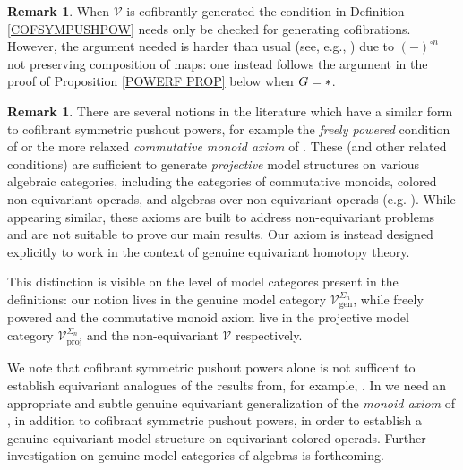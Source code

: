 \documentclass[a4paper,10pt
,draft
]{article}%
\numberwithin{equation}{section}
\numberwithin{figure}{section}
\theoremstyle{definition} %
\newtheorem{remark}[equation]{Remark}%
\newcommand{\V}{\ensuremath{\mathcal V}}
\newcommand{\1}{\ensuremath{\mathbbm 1}}%
\begin{document}
\begin{remark}
When $\mathcal{V}$ is cofibrantly generated
the condition in Definition \ref{COFSYMPUSHPOW} needs only be checked for generating cofibrations. 
However, the argument needed is harder than usual
(see, e.g., \cite[Lemma 2.1.20]{Ho98}) due to $(-)^{\square n}$ not preserving composition of maps:
one instead follows the argument in the proof of 
Proposition \ref{POWERF PROP} below when $G=\**$.
\end{remark}

\begin{remark}
      \label{CSPP_REM}
      There are several notions in the literature which have a similar form to cofibrant symmetric pushout powers,
      for example
      the \textit{freely powered} condition of \cite[Def. 4.5.4.2]{Lur17}
      or the more relaxed \textit{commutative monoid axiom} of \cite[Def. 3.1]{Wh16}.
      These (and other related conditions) are sufficient to generate \textit{projective} model structures on various algebraic categories,
      including the categories of commutative monoids, colored non-equivariant operads, and algebras over non-equivariant operads (e.g. \cite{Wh16,WY18}).
      While appearing similar,
      these axioms are built to address non-equivariant problems and are not suitable to prove our main results.
      Our axiom is instead designed explicitly to work in the context of genuine equivariant homotopy theory.

      This distinction is visible on the level of model categores present in the definitions:
      our notion lives in the genuine model category $\V^{\Sigma_n}_{\text{gen}}$,
      while freely powered and the commutative monoid axiom live in
      the projective model category $\V^{\Sigma_n}_{\text{proj}}$
      and the non-equivariant $\V$ respectively.

      We note that cofibrant symmetric pushout powers alone is not sufficent
      to establish equivariant analogues of the results from, for example, \cite{Wh16,WY18}.
      In \cite{BP_HGOP} we need an appropriate and subtle genuine equivariant generalization of the
      \textit{monoid axiom} of \cite{SS00},
      in addition to cofibrant symmetric pushout powers,
      in order to establish a genuine equivariant model structure on equivariant colored operads.
      Further investigation on genuine model categories of algebras is forthcoming.
\end{remark}
\end{document}
